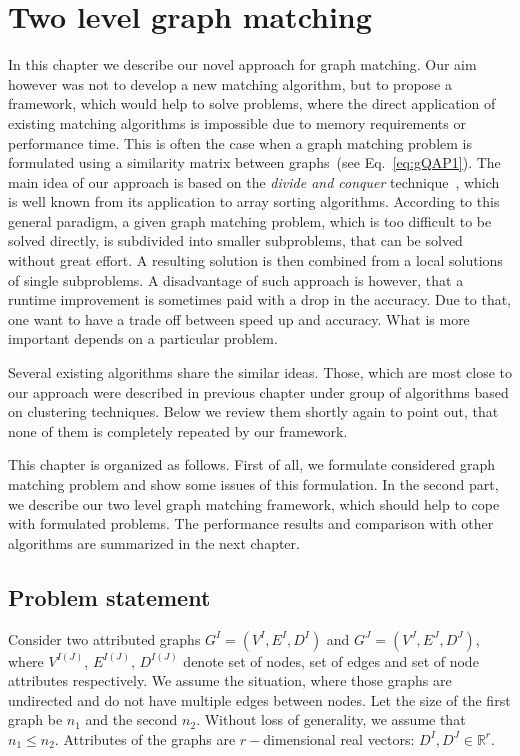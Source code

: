 \chapter{Two level graph matching} \label{chapter:2levelGM}
In this chapter we describe our novel approach for graph matching. Our aim however was not to develop a new matching algorithm, but to propose a framework, which would help to solve problems, where the direct application of existing matching algorithms is impossible due to memory requirements or performance time. This is often the case when a graph matching problem is formulated using a similarity matrix between graphs~(see Eq.~\eqref{eq:gQAP1}). The main idea of our approach is based on the  \emph{divide and conquer} technique~\cite{Cormen}, which is well known from its application to array sorting algorithms. According to this general paradigm, a given graph matching problem, which is too difficult to be solved directly, is subdivided into smaller subproblems, that can be solved without great effort. A resulting solution is then combined from a local solutions of single subproblems. A disadvantage of such approach is however, that a runtime improvement is sometimes paid with a drop in the accuracy.
Due to that, one want to have a trade off between speed up and accuracy. What is more important depends on a particular problem.

Several existing algorithms share the similar ideas. Those, which are most close to our approach were described in previous chapter under group of algorithms based on clustering techniques. Below we review them shortly again to point out, that none of them is completely repeated by our framework.

This chapter is organized as follows. First of all, we formulate considered graph matching problem and show some issues of this formulation. In the second part, we describe our two level graph matching framework, which should help to cope with formulated problems. The performance results and comparison with other algorithms are summarized in the next chapter. 
\section{Problem statement} \label{sec:prob_stat}
Consider two attributed graphs $G^I = (V^I, E^I, D^I)$ and $G^J = (V^J, E^J, D^J)$, where $V^{I(J)}$, $E^{I(J)}$, $D^{I(J)}$ denote set of nodes, set of edges and set of node attributes respectively. We assume the situation, where those graphs are undirected and do not have multiple edges between nodes. Let the size of the first graph be $n_1$ and the second $n_2$. Without loss of generality, we assume that $n_1\le n_2$. Attributes of the graphs are $r-$dimensional real vectors: $D^I,D^J\in\mathbb{R}^r$.

